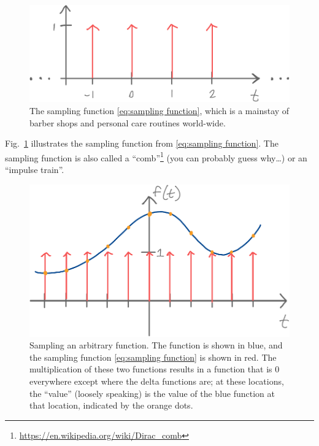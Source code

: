 \documentclass[11pt]{article}
\newcommand{\figref}[1]{Fig.~\ref{#1}}
\begin{document}
\begin{figure}
    \centering
    \includegraphics[width=\textwidth]{../figures/lecture01/sampling-function.pdf}
    \caption{The sampling function \eqref{eq:sampling function}, which is a mainstay of barber shops and personal care routines world-wide.}
    \label{fig:sampling function}
\end{figure}

\figref{fig:sampling function} illustrates the sampling function from \eqref{eq:sampling function}. The sampling function is also called a ``comb''\footnote{\href{https://en.wikipedia.org/wiki/Dirac_comb}{https://en.wikipedia.org/wiki/Dirac\_comb}} (you can probably guess why\dots) or an ``impulse train''.

\begin{figure}
    \centering
    \includegraphics[width=\textwidth]{../figures/lecture01/sampling-an-arbitrary-function.pdf}
    \caption{Sampling an arbitrary function. The function is shown in blue, and the sampling function \eqref{eq:sampling function} is shown in red. The multiplication of these two functions results in a function that is 0 everywhere except where the delta functions are; at these locations, the ``value'' (loosely speaking) is the value of the blue function at that location, indicated by the orange dots.}
    \label{fig:sampling an arbitrary function}
\end{figure}
\end{document}
